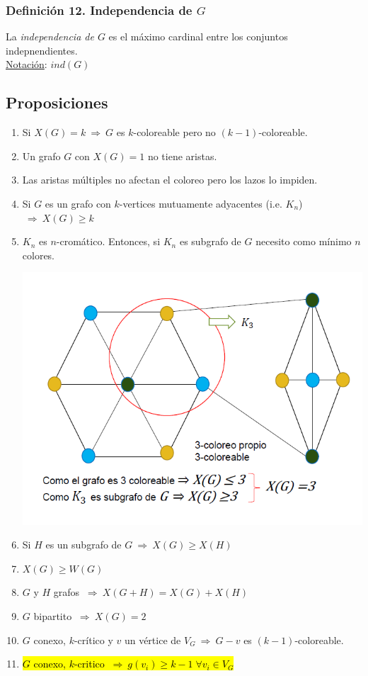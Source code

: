 \documentclass{article}
\newcommand{\Rightarrows}{\: \Rightarrow \:}            %
\begin{document}
\subsubsection*{Definición 12. Independencia de $G$}
La \emph{independencia de $G$} es el máximo cardinal entre los conjuntos indepnendientes.
\\\underline{Notación}: $ind(G)$
\subsection{Proposiciones}
\begin{enumerate}
    \item Si $X(G)=k \Rightarrows G$ es $k$-coloreable pero no $(k-1)$-coloreable.
    \item Un grafo $G$ con $X(G) = 1$ no tiene aristas.
    \item Las aristas múltiples no afectan el coloreo pero los lazos lo impiden.
    \item Si $G$ es un grafo con $k$-vertices mutuamente adyacentes (i.e. $K_n$) $\Rightarrows X(G) \geq k$
    \item $K_n$ es $n$-cromático. Entonces, si $K_n$ es subgrafo de $G$ necesito como mínimo $n$ colores.
    \begin{center}
        \includegraphics[width=.50\textwidth]{knNcoloreable.PNG}
    \end{center}
    \item Si $H$ es un subgrafo de $G \Rightarrows X(G) \geq X(H)$
    \item $X(G) \geq W(G)$
    \item $G$ y $H$ grafos $\Rightarrows X(G + H) = X(G) + X(H)$
    \item $G$ bipartito $\Rightarrows X(G) = 2$
    \item $G$ conexo, $k$-crítico y $v$ un vértice de $V_G \Rightarrows G-v$ es $(k-1)$-coloreable.
    \item \hl{$G$ conexo, $k$-critico $\Rightarrows g(v_i) \geq k - 1\; \forall v_i \in V_G$}

\end{enumerate}
\end{document}
